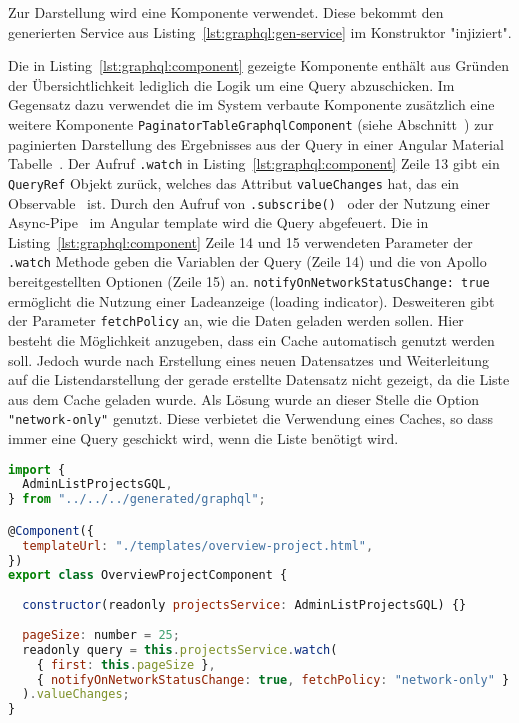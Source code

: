 Zur Darstellung wird eine Komponente verwendet. Diese bekommt den generierten Service aus Listing~\ref{lst:graphql:gen-service} im Konstruktor "injiziert". 

Die in Listing~\ref{lst:graphql:component} gezeigte Komponente enthält aus Gründen der Übersichtlichkeit lediglich die Logik um eine Query abzuschicken. Im Gegensatz dazu verwendet die im System verbaute Komponente zusätzlich eine weitere Komponente \texttt{PaginatorTableGraphql\-Component} (siehe Abschnitt~) zur paginierten Darstellung des Ergebnisses aus der Query in einer Angular Material Tabelle~\cite{angular-material-table}.
Der Aufruf \texttt{.watch} in Listing~\ref{lst:graphql:component} Zeile 13 gibt ein \texttt{QueryRef} Objekt zurück, welches das Attribut \texttt{valueChanges} hat, das ein Observable~\cite{angular-observable} ist.
Durch den Aufruf von \texttt{.subscribe()}~\cite{angular-subscribe} oder der Nutzung einer Async-Pipe~\cite{angular-async-pipe} im Angular template wird die Query abgefeuert.
Die in Listing~\ref{lst:graphql:component} Zeile 14 und 15 verwendeten Parameter der \texttt{.watch} Methode geben die Variablen der Query (Zeile 14) und die von Apollo bereitgestellten Optionen (Zeile 15) an.
\texttt{notifyOnNetworkStatusChange: true} ermöglicht die Nutzung einer Ladeanzeige (loading indicator). Desweiteren gibt der Parameter \texttt{fetchPolicy} an, wie die Daten geladen werden sollen. Hier besteht die Möglichkeit anzugeben, dass ein Cache automatisch genutzt werden soll. Jedoch wurde nach Erstellung eines neuen Datensatzes und Weiterleitung auf die Listendarstellung der gerade erstellte Datensatz nicht gezeigt, da die Liste aus dem Cache geladen wurde. Als Lösung wurde an dieser Stelle die Option \texttt{"network-only"} genutzt. Diese verbietet die Verwendung eines Caches, so dass immer eine Query geschickt wird, wenn die Liste benötigt wird.

\begin{lstlisting}[language=JavaScript,float=h!,caption={Angular Komponente zum Anzeigen der Projekte in Listendarstellung}, label={lst:graphql:component}]
import {
  AdminListProjectsGQL,
} from "../../../generated/graphql";

@Component({
  templateUrl: "./templates/overview-project.html",
})
export class OverviewProjectComponent {  
  
  constructor(readonly projectsService: AdminListProjectsGQL) {}
  
  pageSize: number = 25;
  readonly query = this.projectsService.watch(
    { first: this.pageSize },
    { notifyOnNetworkStatusChange: true, fetchPolicy: "network-only" }
  ).valueChanges;
}
\end{lstlisting}

